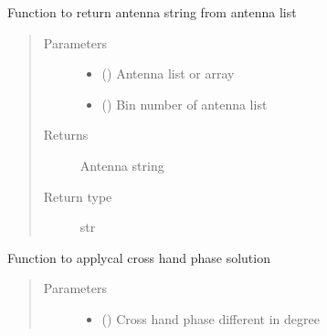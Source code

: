 \documentclass[letterpaper,10pt,english]{sphinxmanual}
\begin{document}
\begin{fulllineitems}
\begin{fulllineitems}
\label{\detokenize{paircars:paircars.fullpol_selfcal_LTS.PolSelfcal.antenna_string}}
\sphinxAtStartPar
Function to return antenna string from antenna list
\begin{quote}\begin{description}
\item[{Parameters}] \leavevmode\begin{itemize}
\item {} 
\sphinxAtStartPar
{} () \textendash{} Antenna list or array

\item {} 
\sphinxAtStartPar
{} () \textendash{} Bin number of antenna list

\end{itemize}

\item[{Returns}] \leavevmode
\sphinxAtStartPar
Antenna string

\item[{Return type}] \leavevmode
\sphinxAtStartPar
str

\end{description}\end{quote}

\end{fulllineitems}


\begin{fulllineitems}
\label{\detokenize{paircars:paircars.fullpol_selfcal_LTS.PolSelfcal.apply_cross_hand_phase}}
\sphinxAtStartPar
Function to applycal cross hand phase solution
\begin{quote}\begin{description}
\item[{Parameters}] \leavevmode\begin{itemize}
\item {} 
\sphinxAtStartPar
{} () \textendash{} Cross hand phase different in degree


\end{itemize}
\end{description}
\end{quote}
\end{fulllineitems}
\end{fulllineitems}
\end{document}
